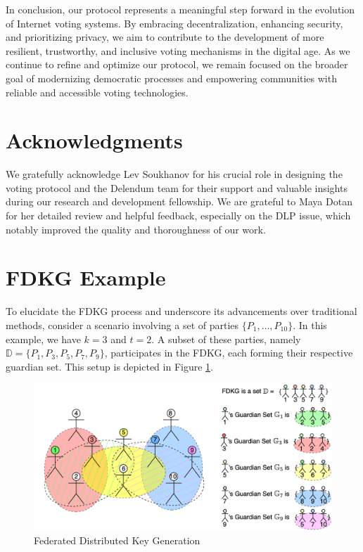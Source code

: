 \documentclass[runningheads]{llncs}
\begin{document}
In conclusion, our protocol represents a meaningful step forward in the evolution of Internet voting systems. By embracing decentralization, enhancing security, and prioritizing privacy, we aim to contribute to the development of more resilient, trustworthy, and inclusive voting mechanisms in the digital age. As we continue to refine and optimize our protocol, we remain focused on the broader goal of modernizing democratic processes and empowering communities with reliable and accessible voting technologies.

\section{Acknowledgments}
We gratefully acknowledge Lev Soukhanov for his crucial role in designing the voting protocol and the Delendum team for their support and valuable insights during our research and development fellowship. We are grateful to Maya Dotan for her detailed review and helpful feedback, especially on the DLP issue, which notably improved the quality and thoroughness of our work.




\appendix

\section{FDKG Example}

To elucidate the FDKG process and underscore its advancements over traditional methods, consider a scenario involving a set of parties $\{P_1, \ldots, P_{10}\}$. In this example, we have $k = 3$ and $t = 2$. A subset of these parties, namely $\mathbb{D} = \{P_1, P_3, P_5, P_7, P_9\}$, participates in the FDKG, each forming their respective guardian set. This setup is depicted in Figure \ref{fig:FDKG}.

\begin{figure}
    \centering
    \includegraphics[width=\textwidth]{FDKG.png}
    \caption{Federated Distributed Key Generation}
    \label{fig:FDKG}
\end{figure}
\end{document}
